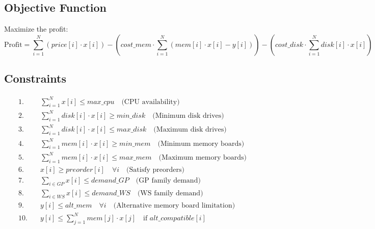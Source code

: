 \documentclass{article}
\begin{document}
\subsection*{Objective Function}
Maximize the profit:
\[
\text{Profit} = \sum_{i=1}^{N} (price[i] \cdot x[i]) - (cost\_mem \cdot \sum_{i=1}^{N} (mem[i] \cdot x[i] - y[i])) - (cost\_disk \cdot \sum_{i=1}^{N} disk[i] \cdot x[i])
\]

\subsection*{Constraints}
\begin{align*}
1. & \quad \sum_{i=1}^{N} x[i] \leq max\_cpu \quad \text{(CPU availability)} \\
2. & \quad \sum_{i=1}^{N} disk[i] \cdot x[i] \geq min\_disk \quad \text{(Minimum disk drives)} \\
3. & \quad \sum_{i=1}^{N} disk[i] \cdot x[i] \leq max\_disk \quad \text{(Maximum disk drives)} \\
4. & \quad \sum_{i=1}^{N} mem[i] \cdot x[i] \geq min\_mem \quad \text{(Minimum memory boards)} \\
5. & \quad \sum_{i=1}^{N} mem[i] \cdot x[i] \leq max\_mem \quad \text{(Maximum memory boards)} \\
6. & \quad x[i] \geq preorder[i] \quad \forall i \quad \text{(Satisfy preorders)} \\
7. & \quad \sum_{i \in GP} x[i] \leq demand\_GP \quad \text{(GP family demand)} \\
8. & \quad \sum_{i \in WS} x[i] \leq demand\_WS \quad \text{(WS family demand)} \\
9. & \quad y[i] \leq alt\_mem \quad \forall i \quad \text{(Alternative memory board limitation)} \\
10. & \quad y[i] \leq \sum_{j=1}^{N} mem[j] \cdot x[j] \quad \text{if } alt\_compatible[i] \\
\end{align*}
\end{document}
